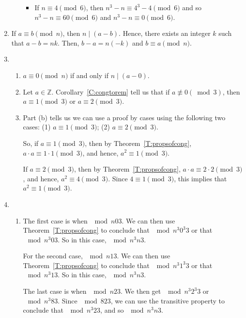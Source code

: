 \begin{enumerate}
\begin{enumerate}
\begin{itemize}
\item If $n \equiv 4 \pmod 6$, then $n^3 - n \equiv 4^3 - 4 \pmod 6$ and so 
$n^3 - n \equiv 60 \pmod 6$ and $n^3 - n \equiv 0 \pmod 6$.
\end{itemize}
\end{enumerate}
 


\item If  $a \equiv b \pmod n$,  then  $n \mid ( a - b )$.  Hence, there exists an integer $k$ such that $a - b = nk$.  Then, $b - a = n ( -k )$ and $b \equiv a \pmod n$.



\item
\begin{enumerate}
\item $a \equiv 0 \pmod n$ if and only if $n \mid \left( a - 0 \right)$.

\item Let  $a \in \mathbb{Z}$.  Corollary~\ref{C:congtorem} tell us that  if  $a \not \equiv 0 \left( {\bmod 3} \right)$, then  \\
$a \equiv 1 \pmod 3$ or  
$a \equiv 2 \pmod 3$.

\item Part (b) tells us we can use a proof by cases using the following two cases:  
(1) $a \equiv 1 \pmod 3$;  (2) $a \equiv 2 \pmod 3$.

So, if $a \equiv 1 \pmod 3$, then by Theorem~\ref{T:propsofcong}, 
$a \cdot a \equiv 1 \cdot 1 \pmod 3$, and hence, $a^2 \equiv 1 \pmod 3$.

If $a \equiv 2 \pmod 3$, then by Theorem~\ref{T:propsofcong}, 
$a \cdot a \equiv 2 \cdot 2 \pmod 3$, and hence, $a^2 \equiv 4 \pmod 3$.  Since 
$4 \equiv 1 \pmod 3$, this implies that $a^2 \equiv 1 \pmod 3$.
\end{enumerate}


\item \begin{enumerate}
\item The first case is when $\mod{n}{0}{3}$.  We can then use Theorem~\ref{T:propsofcong} to conclude that $\mod{n^3}{0^3}{3}$ or that $\mod{n^3}{0}{3}$.  So in this case, $\mod{n^3}{n}{3}$.

\noindent
For the second case, $\mod{n}{1}{3}$.  We can then use Theorem~\ref{T:propsofcong} to conclude that $\mod{n^3}{1^3}{3}$ or that $\mod{n^3}{1}{3}$.  So in this case, $\mod{n^3}{n}{3}$.

\noindent
The last case is when $\mod{n}{2}{3}$.  We then get $\mod{n^3}{2^3}{3}$ or $\mod{n^3}{8}{3}$.  Since $\mod{8}{2}{3}$, we can use the transitive property to conclude that $\mod{n^3}{2}{3}$, and so $\mod{n^3}{n}{3}$.


\end{enumerate}
\end{enumerate}
